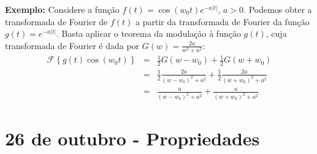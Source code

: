 \documentclass[a4paper,10pt]{book}
\begin{document}
{\bf Exemplo:} Considere a função $f(t)=\cos(w_0t) e^{-a|t|}$, $a>0$. Podemos obter a transformada de Fourier de $f(t)$ a partir da transformada de Fourier da função $g(t)=e^{-a|t|}$. Basta aplicar o teorema da modulação à função $g(t)$, cuja transformada de Fourier é dada por $G(w)=\frac{2a}{w^2+a^2}$:
 \begin{eqnarray*}
 \mathcal{F}\left\{g(t)\cos(w_0t) \right\}&=&\frac{1}{2}G(w-w_0)+\frac{1}{2}G(w+w_0)\\
 &=&\frac{1}{2}\frac{2a}{(w-w_0)^2+a^2}+\frac{1}{2}\frac{2a}{(w+w_0)^2+a^2}\\
 &=&\frac{a}{(w-w_0)^2+a^2}+\frac{a}{(w+w_0)^2+a^2}
 \end{eqnarray*}

 \chapter{26 de outubro - Propriedades}
\end{document}
